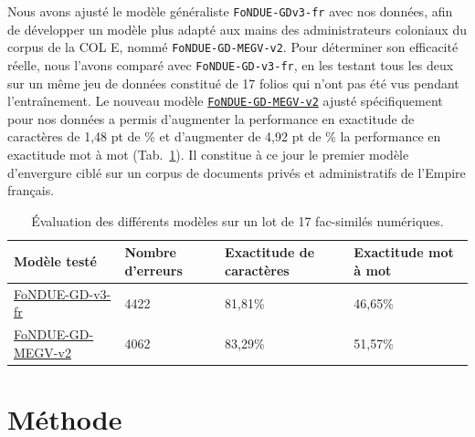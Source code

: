 \documentclass[final, fra]{anthology-ch}     %
\begin{document}
Nous avons ajusté le modèle généraliste \texttt{FoNDUE-GDv3-fr} avec nos données, afin de développer un modèle plus adapté aux mains des administrateurs coloniaux du corpus de la COL E, nommé \texttt{FoNDUE-GD-MEGV-v2}. Pour déterminer son efficacité réelle, nous l'avons comparé avec \texttt{FoNDUE-GD-v3-fr}, en les testant tous les deux sur un même jeu de données constitué de 17 folios qui n'ont pas été vus pendant l'entraînement. Le nouveau modèle \href{https://github.com/Masculinites-Esclavagistes/MEGV-FR-MSS-18/releases/download/v.2.0.0/fondue_gd_megv_v2.mlmodel}{\texttt{FoNDUE-GD-MEGV-v2}} 
ajusté spécifiquement pour nos données a permis d'augmenter la performance en exactitude de caractères de 1,48 pt de \% et d'augmenter de 4,92 pt de \% la performance en exactitude mot à mot \cite{rapport-d-etape-megv}
(Tab.~\ref{tab:description_modèles_efficacité}). Il constitue à ce jour le premier modèle d'envergure ciblé sur un corpus de documents privés et administratifs de l'Empire français.

\begin{table}[h]
\centering\small
\begin{tabular}{p{4cm}p{3.1cm}p{3.1cm}p{3.1cm}} %
\toprule
\textbf{Modèle testé} & \textbf{Nombre d'erreurs} & \textbf{Exactitude de caractères} & \textbf{Exactitude mot à mot}\\
\midrule
\href{FoNDUE-GD-v3-fr}{FoNDUE-GD-v3-fr}& 4422 & 81,81\% & 46,65\% \\ \midrule
\href{https://github.com/Masculinites-Esclavagistes/MEGV-FR-MSS-18/releases/tag/v.2.0.0}{FoNDUE-GD-MEGV-v2} & 4062 & 83,29\% & 51,57\% \\ \bottomrule
\end{tabular}
\caption{Évaluation des différents modèles sur un lot de 17 fac-similés numériques.}
\label{tab:description_modèles_efficacité}
\end{table}


\section{Méthode}
\end{document}
